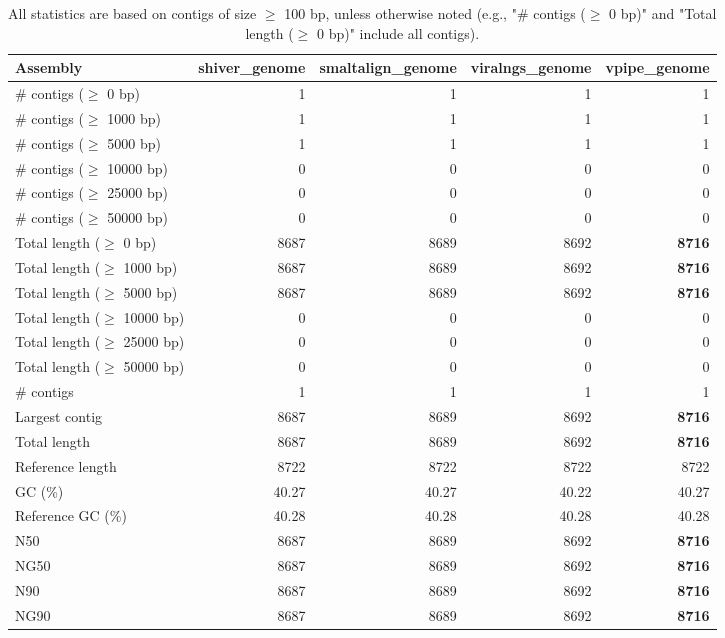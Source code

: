 \documentclass[12pt,a4paper]{article}
\begin{document}
\begin{table}[ht]
\begin{center}
\caption{All statistics are based on contigs of size $\geq$ 100 bp, unless otherwise noted (e.g., "\# contigs ($\geq$ 0 bp)" and "Total length ($\geq$ 0 bp)" include all contigs).}
\begin{tabular}{|l*{4}{|r}|}
\hline
Assembly & shiver\_genome & smaltalign\_genome & viralngs\_genome & vpipe\_genome \\ \hline
\# contigs ($\geq$ 0 bp) & 1 & 1 & 1 & 1 \\ \hline
\# contigs ($\geq$ 1000 bp) & 1 & 1 & 1 & 1 \\ \hline
\# contigs ($\geq$ 5000 bp) & 1 & 1 & 1 & 1 \\ \hline
\# contigs ($\geq$ 10000 bp) & 0 & 0 & 0 & 0 \\ \hline
\# contigs ($\geq$ 25000 bp) & 0 & 0 & 0 & 0 \\ \hline
\# contigs ($\geq$ 50000 bp) & 0 & 0 & 0 & 0 \\ \hline
Total length ($\geq$ 0 bp) & 8687 & 8689 & 8692 & {\bf 8716} \\ \hline
Total length ($\geq$ 1000 bp) & 8687 & 8689 & 8692 & {\bf 8716} \\ \hline
Total length ($\geq$ 5000 bp) & 8687 & 8689 & 8692 & {\bf 8716} \\ \hline
Total length ($\geq$ 10000 bp) & 0 & 0 & 0 & 0 \\ \hline
Total length ($\geq$ 25000 bp) & 0 & 0 & 0 & 0 \\ \hline
Total length ($\geq$ 50000 bp) & 0 & 0 & 0 & 0 \\ \hline
\# contigs & 1 & 1 & 1 & 1 \\ \hline
Largest contig & 8687 & 8689 & 8692 & {\bf 8716} \\ \hline
Total length & 8687 & 8689 & 8692 & {\bf 8716} \\ \hline
Reference length & 8722 & 8722 & 8722 & 8722 \\ \hline
GC (\%) & 40.27 & 40.27 & 40.22 & 40.27 \\ \hline
Reference GC (\%) & 40.28 & 40.28 & 40.28 & 40.28 \\ \hline
N50 & 8687 & 8689 & 8692 & {\bf 8716} \\ \hline
NG50 & 8687 & 8689 & 8692 & {\bf 8716} \\ \hline
N90 & 8687 & 8689 & 8692 & {\bf 8716} \\ \hline
NG90 & 8687 & 8689 & 8692 & {\bf 8716} \\ \hline

\end{tabular}
\end{center}
\end{table}
\end{document}
